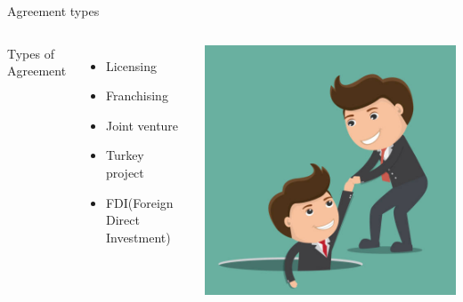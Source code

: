 \begin{frame}{Agreement types}
\begin{columns}
Types of Agreement
\begin{itemize}
	\item Licensing
	\item Franchising
	\item Joint venture
	\item Turkey project
	\item FDI(Foreign Direct Investment)
\end{itemize}
\includegraphics[width=\textwidth]{img/friendship.jpg}
\end{columns}
\end{frame}
